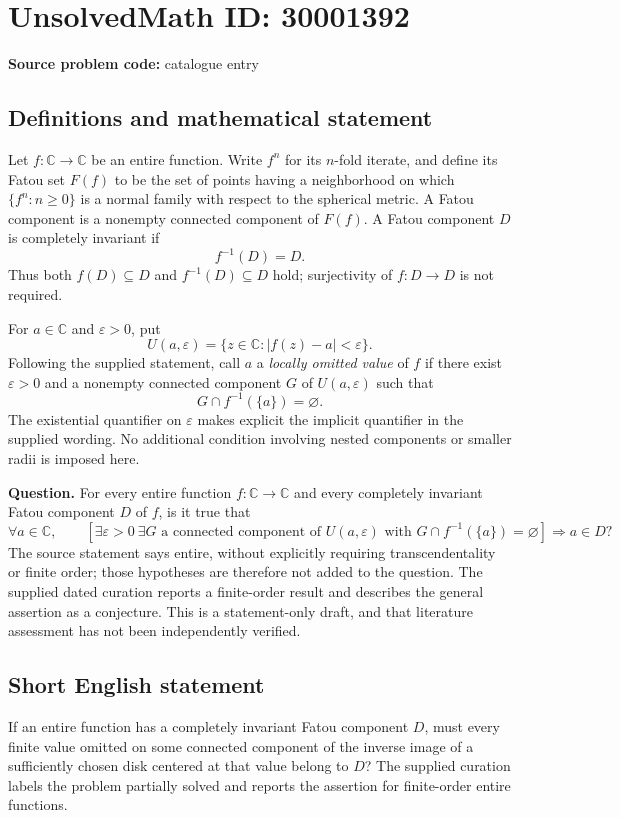 \documentclass[11pt]{article}
\newcommand{\C}{\mathbb{C}}
\begin{document}
\section*{UnsolvedMath ID: 30001392}
\textbf{Source problem code:} catalogue entry
\subsection{Definitions and mathematical statement}
Let \(f:\C\to\C\) be an entire function. Write \(f^n\) for its \(n\)-fold iterate, and define its Fatou set \(F(f)\) to be the set of points having a neighborhood on which \(\{f^n:n\geq 0\}\) is a normal family with respect to the spherical metric. A Fatou component is a nonempty connected component of \(F(f)\). A Fatou component \(D\) is completely invariant if
\[
 f^{-1}(D)=D.
\]
Thus both \(f(D)\subseteq D\) and \(f^{-1}(D)\subseteq D\) hold; surjectivity of \(f:D\to D\) is not required.

For \(a\in\C\) and \(\varepsilon>0\), put
\[
 U(a,\varepsilon)=\{z\in\C:|f(z)-a|<\varepsilon\}.
\]
Following the supplied statement, call \(a\) a \emph{locally omitted value} of \(f\) if there exist \(\varepsilon>0\) and a nonempty connected component \(G\) of \(U(a,\varepsilon)\) such that
\[
 G\cap f^{-1}(\{a\})=\varnothing.
\]
The existential quantifier on \(\varepsilon\) makes explicit the implicit quantifier in the supplied wording. No additional condition involving nested components or smaller radii is imposed here.

\textbf{Question.} For every entire function \(f:\C\to\C\) and every completely invariant Fatou component \(D\) of \(f\), is it true that
\[
 \forall a\in\C,\qquad
 \left[
 \exists\varepsilon>0\ \exists G\text{ a connected component of }U(a,\varepsilon)
 \text{ with }G\cap f^{-1}(\{a\})=\varnothing
 \right]
 \Longrightarrow a\in D?
\]
The source statement says entire, without explicitly requiring transcendentality or finite order; those hypotheses are therefore not added to the question. The supplied dated curation reports a finite-order result and describes the general assertion as a conjecture. This is a statement-only draft, and that literature assessment has not been independently verified.
\subsection{Short English statement}
If an entire function has a completely invariant Fatou component \(D\), must every finite value omitted on some connected component of the inverse image of a sufficiently chosen disk centered at that value belong to \(D\)? The supplied curation labels the problem partially solved and reports the assertion for finite-order entire functions.
\end{document}
